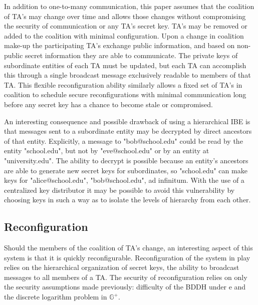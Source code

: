 \documentclass[10pt]{llncs}
\begin{document}
	In addition to one-to-many communication, this paper assumes that the coalition of TA's may change over time and allows those changes without compromising the security of communication or any TA's secret key.  TA's may be removed or added to the coalition with minimal configuration.  Upon a change in coalition make-up the participating TA's exchange public information, and based on non-public secret information they are able to communicate.  The private keys of subordinate entities of each TA must be updated, but each TA can accomplish this through a single broadcast message exclusively readable to members of that TA.  This flexible reconfiguration ability similarly allows a fixed set of TA's in coalition to schedule secure reconfigurations with minimal communication long before any secret key has a chance to become stale or compromised.

	An interesting consequence and possible drawback of using a hierarchical IBE is that messages sent to a subordinate entity may be decrypted by direct ancestors of that entity.  Explicitly, a message to "bob@school.edu" could be read by the entity "school.edu", but not by "eve@school.edu" or by an entity at "university.edu".  The ability to decrypt is possible because an entity's ancestors are able to generate new secret keys for subordinates, so "school.edu" can make keys for "alice@school.edu", "bob@school.edu", ad infinitum.  With the use of a centralized key distributor it may be possible to avoid this vulnerability by choosing keys in such a way as to isolate the levels of hierarchy from each other.

	\subsection{Reconfiguration}

	Should the members of the coalition of TA's change, an interesting aspect of this system is that it is quickly reconfigurable.  Reconfiguration of the system in play relies on the hierarchical organization of secret keys, the ability to broadcast messages to all members of a TA.  The security of reconfiguration relies on only the security assumptions made previously: difficulty of the BDDH under e and the discrete logarithm problem in $\mathbb{G}^+$.
\end{document}

